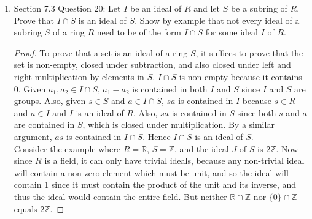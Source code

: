\documentclass{article}
\begin{document}
\begin{enumerate}[label={\bf Q\arabic*:}]
\begin{enumerate}
        \begin{proof}
          First, note that $\varphi(u)\neq0_S$ otherwise for every $r\in
          R$, \[\varphi(r)=\varphi(ru^{-1}u)=
          \varphi(r)\varphi(u)\varphi(u^{-1})=0_S,\] which implies
          $\varphi$ is the zero homomorphism. Now we have
          \begin{align*}
            \varphi(u)\varphi(u^{-1}) &= \varphi(uu^{-1}) \\
              &= \varphi(1_R) \\
              &= 1_S \\
              &= \varphi(1_R) \\
              &= \varphi(u^{-1}u) \\
              &= \varphi(u^{-1})\varphi(u), \\
          \end{align*}
          which implies that $\varphi(u)$ has a multiplicative inverse
          $\varphi(u^{-1})$ in $S$, as we are required to show.
        \end{proof}
    \end{enumerate}

  \item Section 7.3 Question 20: Let $I$ be an ideal of $R$ and let $S$ be
    a subring of $R$. Prove that $I\cap S$ is an ideal of $S$. Show by
    example that not every ideal of a subring $S$ of a ring $R$ need to be
    of the form $I\cap S$ for some ideal $I$ of $R$.

    \begin{proof}
      To prove that a set is an ideal of a ring $S$, it suffices to prove
      that the set is non-empty, closed under subtraction, and also closed
      under left and right multiplication by elements in $S$. $I\cap S$ is
      non-empty because it contains 0. Given $a_1,a_2\in I\cap S$,
      $a_1-a_2$ is contained in both $I$ and $S$ since $I$ and $S$ are
      groups. Also, given $s\in S$ and $a\in I\cap S$, $sa$ is contained in
      $I$ because $s\in R$ and $a\in I$ and $I$ is an ideal of $R$. Also,
      $sa$ is contained in $S$ since both $s$ and $a$ are contained in $S$,
      which is closed under multiplication.  By a similar argument, $as$ is
      contained in $I\cap S$. Hence $I\cap S$ is an ideal of $S$. \\

      Consider the example where $R=\mathbb{R}$, $S=\mathbb{Z}$, and the
      ideal $J$ of $S$ is $2\mathbb{Z}$. Now since $R$ is a field, it can
      only have trivial ideals, because any non-trivial ideal will contain
      a non-zero element which must be unit, and so the ideal will contain
      1 since it must contain the product of the unit and its inverse, and
      thus the ideal would contain the entire field. But neither
      $\mathbb{R}\cap\mathbb{Z}$ nor $\{0\}\cap\mathbb{Z}$ equals
      $2\mathbb{Z}$.
    \end{proof}


\end{enumerate}
\end{document}

